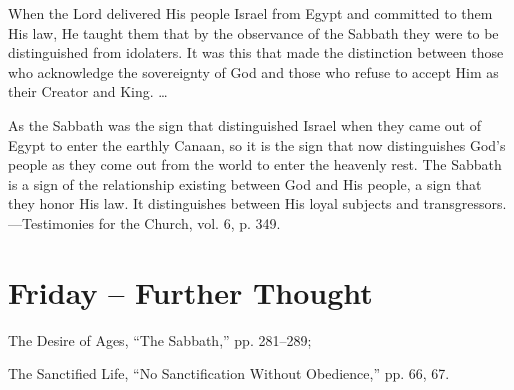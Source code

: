 \documentclass[a4paper, 10pt, twoside, headings=small]{scrartcl}
\begin{document}
\begin{multicols}{2}
When the Lord delivered His people Israel from Egypt and committed to them His law, He taught them that by the observance of the Sabbath they were to be distinguished from idolaters. It was this that made the distinction between those who acknowledge the sovereignty of God and those who refuse to accept Him as their Creator and King. …

As the Sabbath was the sign that distinguished Israel when they came out of Egypt to enter the earthly Canaan, so it is the sign that now distinguishes God’s people as they come out from the world to enter the heavenly rest. The Sabbath is a sign of the relationship existing between God and His people, a sign that they honor His law. It distinguishes between His loyal subjects and transgressors.—Testimonies for the Church, vol. 6, p. 349.

\section*{Friday – Further Thought}

\setlength{\parindent}{0pt}The Desire of Ages, “The Sabbath,” pp. 281–289;

The Sanctified Life, “No Sanctification Without Obedience,” pp. 66, 67.

\end{multicols}
\end{document}
